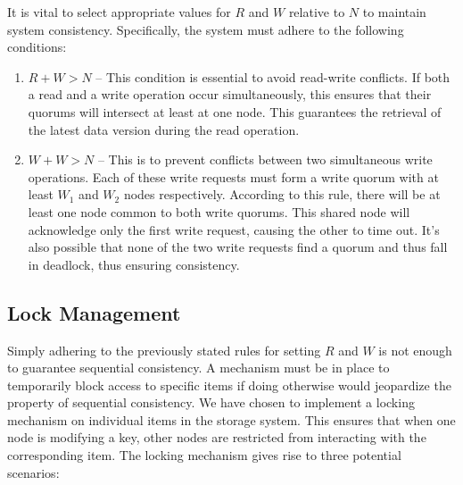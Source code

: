 \documentclass[a4paper, 11pt]{article}
\begin{document}
It is vital to select appropriate values for $R$ and $W$ relative to $N$ to maintain system consistency. Specifically, the system must adhere to the following conditions:
\begin{enumerate}
    \item $R + W > N$ -- This condition is essential to avoid read-write conflicts. If both a read and a write operation occur simultaneously, this ensures that their quorums will intersect at least at one node. This guarantees the retrieval of the latest data version during the read operation.
    \item $W + W > N$ -- This is to prevent conflicts between two simultaneous write operations. Each of these write requests must form a write quorum with at least $ W_1 $ and $W_2$ nodes respectively. According to this rule, there will be at least one node common to both write quorums. This shared node will acknowledge only the first write request, causing the other to time out. It's also possible that none of the two write requests find a quorum and thus fall in deadlock, thus ensuring consistency.
\end{enumerate}



\subsection{Lock Management}
Simply adhering to the previously stated rules for setting $ R $ and $ W $ is not enough to guarantee sequential consistency. A mechanism must be in place to temporarily block access to specific items if doing otherwise would jeopardize the property of sequential consistency. We have chosen to implement a locking mechanism on individual items in the storage system. This ensures that when one node is modifying a key, other nodes are restricted from interacting with the corresponding item. The locking mechanism gives rise to three potential scenarios:
\end{document}
